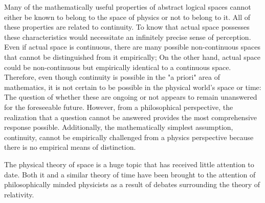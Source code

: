 \documentclass[a4paper,12pt]{book}[2004/02/16]
\theoremstyle{ilemma}
\theoremstyle{itheorem}
\theoremstyle{iother}
\theoremstyle{icorollary}
\theoremstyle{numcorollary}
\theoremstyle{idefinition}
\begin{document}
Many of the mathematically useful properties of abstract logical spaces cannot either be known to belong to the space of physics or not to belong to it. All of these properties are related to continuity.
To know that actual space possesses these characteristics would necessitate an infinitely precise sense of perception. Even if actual space is continuous, there are many possible non-continuous spaces that cannot be distinguished from it empirically; On the other hand, actual space could be non-continuous but empirically identical to a continuous space. Therefore, even though continuity is possible in the "a priori" area of mathematics, it is not certain to be possible in the physical world's space or time: The question of whether these are ongoing or not appears to remain unanswered for the foreseeable future. However, from a philosophical perspective, the realization that a question cannot be answered provides the most comprehensive response possible. Additionally, the mathematically simplest assumption, continuity, cannot be empirically challenged from a physics perspective because there is no empirical means of distinction.

The physical theory of space is a huge topic that has received little attention to date. Both it and a similar theory of time have been brought to the attention of philosophically minded physicists as a result of debates surrounding the theory of relativity.
\end{document}
